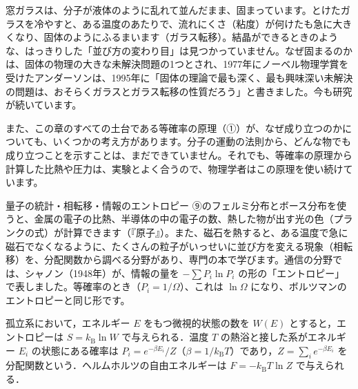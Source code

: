 \begin{phmada}
窓ガラスは、分子が液体のように乱れて並んだまま、固まっています。とけたガラスを冷やすと、ある温度のあたりで、流れにくさ（粘度）が何けたも急に大きくなり、固体のようにふるまいます（ガラス転移）。結晶ができるときのような、はっきりした「並び方の変わり目」は見つかっていません。なぜ固まるのかは、固体の物理の大きな未解決問題の1つとされ、1977年にノーベル物理学賞を受けたアンダーソンは、1995年に「固体の理論で最も深く、最も興味深い未解決の問題は、おそらくガラスとガラス転移の性質だろう」と書きました。今も研究が続いています。

また、この章のすべての土台である等確率の原理（①）が、なぜ成り立つのかについても、いくつかの考え方があります。分子の運動の法則から、どんな物でも成り立つことを示すことは、まだできていません。それでも、等確率の原理から計算した比熱や圧力は、実験とよく合うので、物理学者はこの原理を使い続けています。
\end{phmada}

\begin{phsaki}{量子の統計・相転移・情報のエントロピー}
⑨のフェルミ分布とボース分布を使うと、金属の電子の比熱、半導体の中の電子の数、熱した物が出す光の色（プランクの式）が計算できます（『原子』）。また、磁石を熱すると、ある温度で急に磁石でなくなるように、たくさんの粒子がいっせいに並び方を変える現象（相転移）を、分配関数から調べる分野があり、専門の本で学びます。通信の分野では、シャノン（1948年）が、情報の量を $-\sum P_i\ln P_i$ の形の「エントロピー」で表しました。等確率のとき（$P_i=1/\Omega$）、これは $\ln\Omega$ になり、ボルツマンのエントロピーと同じ形です。
\end{phsaki}

\begin{senmonsho}[統計力学の専門書の書き方]
\begin{bkhonbun}
孤立系において，エネルギー $E$ をもつ微視的状態の数を $W(E)$ とすると，エントロピーは $S=k_{\mathrm B}\ln W$ で与えられる．温度 $T$ の熱浴と接した系がエネルギー $E_i$ の状態にある確率は $P_i=e^{-\beta E_i}/Z$（$\beta=1/k_{\mathrm B}T$）であり，$Z=\sum_ie^{-\beta E_i}$ を分配関数という．ヘルムホルツの自由エネルギーは $F=-k_{\mathrm B}T\ln Z$ で与えられる．
\end{bkhonbun}
\end{senmonsho}

